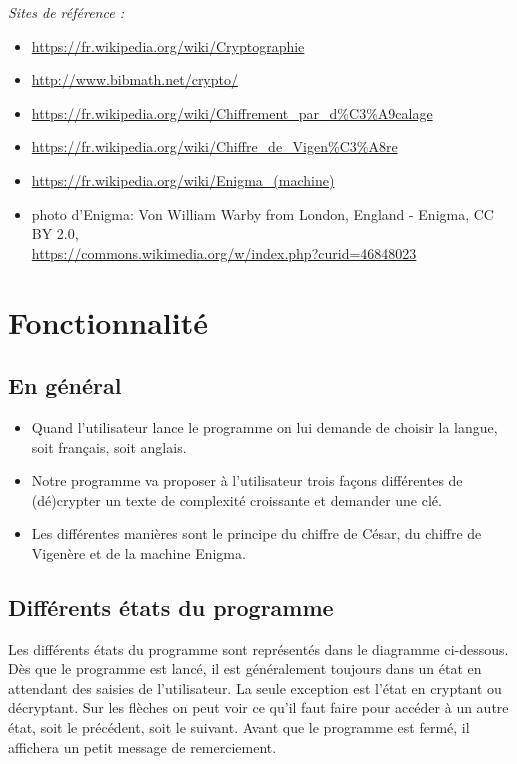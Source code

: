 \documentclass[a4paper,12pt,abstracton,titlepage]{scrartcl}
\begin{document}
\textit{Sites de référence :}
\begin{itemize}
\item \url{https://fr.wikipedia.org/wiki/Cryptographie}
\item \url{http://www.bibmath.net/crypto/}
\item \url{https://fr.wikipedia.org/wiki/Chiffrement_par_d\%C3\%A9calage}
\item \url{https://fr.wikipedia.org/wiki/Chiffre_de_Vigen\%C3\%A8re}
\item \url{https://fr.wikipedia.org/wiki/Enigma_(machine)}
\item photo d’Enigma:
Von William Warby from London, England - Enigma, CC BY 2.0,\\\url{https://commons.wikimedia.org/w/index.php?curid=46848023}\\
\end{itemize}



\newpage
\section{Fonctionnalité}

\subsection{En général}
\begin{itemize}
\item Quand l’utilisateur lance le programme on lui demande de choisir la langue, soit français, soit anglais.
\item Notre programme va proposer à l’utilisateur trois façons différentes de (dé)crypter un texte de complexité croissante et demander une clé.
\item Les différentes manières sont le principe du chiffre de César, du chiffre de Vigenère et de la machine Enigma.
\end{itemize}

\subsection{Différents états du programme}
Les différents états du programme sont représentés dans le diagramme ci-dessous. Dès que le programme est lancé, il est généralement toujours dans un état en attendant des saisies de l'utilisateur. La seule exception est l'état en cryptant ou décryptant.
Sur les flèches on peut voir ce qu'il faut faire pour accéder à un autre état, soit le précédent, soit le suivant.
Avant que le programme est fermé, il affichera un petit message de remerciement.\\
\end{document}
